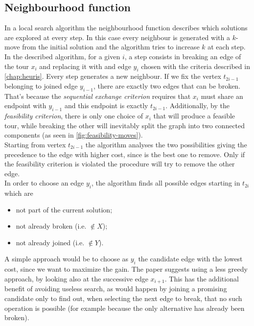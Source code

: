 \subsection{Neighbourhood function}
\label{ssec:neighbourhood}
In a local search algorithm the neighbourhood function describes which solutions are explored at every step. In this case every neighbour is generated with a $k$-move from the initial solution and the algorithm tries to increase $k$ at each step.\\
In the described algorithm, for a given $i$, a step consists in breaking an edge of the tour $x_i$ and replacing it with  and edge $y_i$ chosen with the criteria described in \cref{chap:heuris}. Every step generates a new neighbour.
If we fix the vertex $t_{2i-1}$ belonging to joined edge $y_{i-1}$, there are exactly two edges that can be broken. That's because the \emph{sequential exchange criterion} requires that $x_i$ must share an endpoint with $y_{i-1}$ and this endpoint is exactly $t_{2i-1}$. Additionally, by the \emph{feasibility criterion}, there is only one choice of $x_i$ that will produce a feasible tour, while breaking the other will inevitably split the graph into two connected components (as seen in \cref{fig:feasibility-moves}). \\
Starting from vertex $t_{2i-1}$ the algorithm analyses the two possibilities giving the precedence to the edge with higher cost, since is the best one to remove. Only if the feasibility criterion is violated the procedure will try to remove the other edge.\\
In order to choose an edge $y_i$, the algorithm finds all possible edges starting in $t_{2i}$ which are
\begin{itemize}
	\setlength\itemsep{0.05em}
	\item not part of the current solution;
	\item not already broken (i.e. $\notin X$);
	\item not already joined (i.e. $\notin Y$).
\end{itemize}
A simple approach would be to choose as $y_i$ the candidate edge with the lowest cost, since we want to maximize the gain. The paper suggests using a less greedy approach, by looking also at the successive edge $x_{i+1}$. This has the additional benefit of avoiding useless search, as would happen by joining a promising candidate only to find out, when selecting the next edge to break, that no such operation is possible (for example because the only alternative has already been broken). \\
